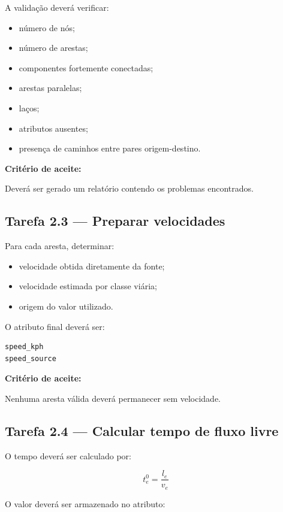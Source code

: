 \documentclass[12pt,a4paper]{article}
\begin{document}
A validação deverá verificar:

\begin{itemize}
    \item número de nós;
    \item número de arestas;
    \item componentes fortemente conectadas;
    \item arestas paralelas;
    \item laços;
    \item atributos ausentes;
    \item presença de caminhos entre pares origem-destino.
\end{itemize}

\textbf{Critério de aceite:}

Deverá ser gerado um relatório contendo os problemas encontrados.

\subsection{Tarefa 2.3 --- Preparar velocidades}

Para cada aresta, determinar:

\begin{itemize}
    \item velocidade obtida diretamente da fonte;
    \item velocidade estimada por classe viária;
    \item origem do valor utilizado.
\end{itemize}

O atributo final deverá ser:

\begin{verbatim}
speed_kph
speed_source
\end{verbatim}

\textbf{Critério de aceite:}

Nenhuma aresta válida deverá permanecer sem velocidade.

\subsection{Tarefa 2.4 --- Calcular tempo de fluxo livre}

O tempo deverá ser calculado por:

\begin{equation}
    t_e^0 = \frac{l_e}{v_e}
\end{equation}

O valor deverá ser armazenado no atributo:
\end{document}
